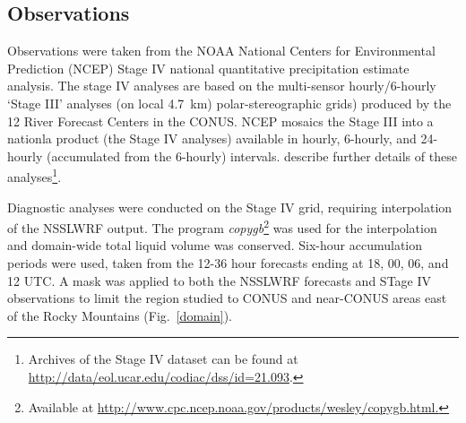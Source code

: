 \subsection{Observations}
\label{observations}

Observations were taken from the NOAA National Centers for Environmental Prediction (NCEP) Stage IV national quantitative precipitation estimate analysis. The stage IV analyses are based on the multi-sensor hourly/6-hourly `Stage III' analyses (on local \mbox{4.7 km}) polar-stereographic grids) produced by the 12 River Forecast Centers in the CONUS. NCEP mosaics the Stage III into a nationla product (the Stage IV analyses) available in hourly, 6-hourly, and 24-hourly (accumulated from the 6-hourly) intervals. \cite{StageIV} describe further details of these analyses\footnote{Archives of the Stage IV dataset can be found at \url{http://data/eol.ucar.edu/codiac/dss/id=21.093}.}.

Diagnostic analyses were conducted on the Stage IV grid, requiring interpolation of the NSSLWRF output. The program \emph{copygb}\footnote{Available at \url{http://www.cpc.ncep.noaa.gov/products/wesley/copygb.html.}} was used for the interpolation and domain-wide total liquid volume was conserved. Six-hour accumulation periods were used, taken from the 12-36 hour forecasts ending at 18, 00, 06, and 12 UTC. A mask was applied to both the NSSLWRF forecasts and STage IV observations to limit the region studied to CONUS and near-CONUS areas east of the Rocky Mountains \mbox{(Fig. \ref{domain})}.


